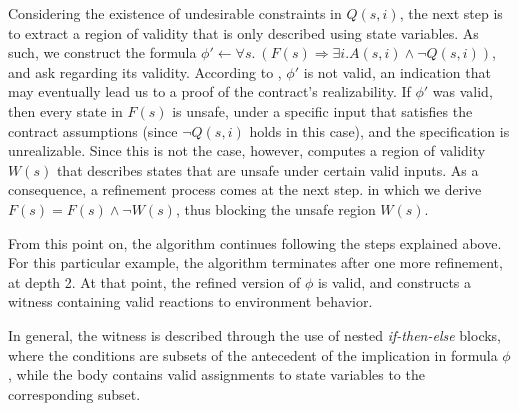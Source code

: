 \iffalse
but Fig.~\ref{fg:snippet} shows part of the generated
$Q(s,i)$, in SMT-LIB format (pre-fix notation), where the input variables are
part of the constraints.~\footnote{The names in the snippet have been simplified to match the rest of the paper.} The variable \textit{\%init} is used in the underlying
machinery as a flag to indicate whether the current state is initial or not
(true and false, respectively). While the actual code is hundreds of lines long, looking at the specific snippet shows us how the valid subset may contain constraints over the inputs, that violate the assumptions. The conjunction in Fig.~\ref{fg:snippet} contains the constraints $(<= i4 \ 2.0)$ and $(<= i5 \ 2.0)$. These conjuncts define a region where the contract assumptions are violated, since it is possible to assign values to $i4$ and $i5$ such that $i4 > 1.0$ and $i5 > 1.0$ respectively. This shows that $Q(s,i)$ is not necessarily a region that satisfies the assumptions in a strict manner, and it is imperative to extract a new region, that only provides constraints over the state variables.
\fi


Considering the existence of undesirable constraints in $Q(s,i)$, the next step
is to extract a region of validity that is only described using state variables.
As such, we construct the formula $\phi' \gets \forall s. \ (F(s) \Rightarrow \exists
i. A(s,i) \land \lnot Q(s,i))$, and ask \aeval regarding its validity. According
to \aeval, $\phi'$ is not valid, an indication that may eventually lead us to a
proof of the contract's realizability. If $\phi'$ was valid, then every state in
$F(s)$ is unsafe, under a specific input that satisfies the contract
assumptions (since $\lnot Q(s,i)$ holds in this case), and the specification is unrealizable. Since this is not the case,
however, \aeval computes a region of validity $W(s)$ that describes states that are unsafe under certain valid inputs. As a consequence, a refinement process comes at the next step. in which we derive $F(s) = F(s) \land \lnot W(s)$, thus blocking the unsafe region $W(s)$.

From this point on, the algorithm continues following the steps
explained above. For this particular example, the algorithm terminates after one
more refinement, at depth 2. At that point, the refined version of
$\phi$ is valid, and \aeval constructs a witness containing valid reactions to
environment behavior.
\iffalse
Fig.~\ref{fg:witness} provides a snippet of
that witness, after being translated to a C implementation.
\fi
In general, the witness is described through the use of nested \textit{if-then-else} blocks, where the conditions are subsets of the antecedent of the implication in formula $\phi$, while the body contains valid assignments to
state variables to the corresponding subset.

